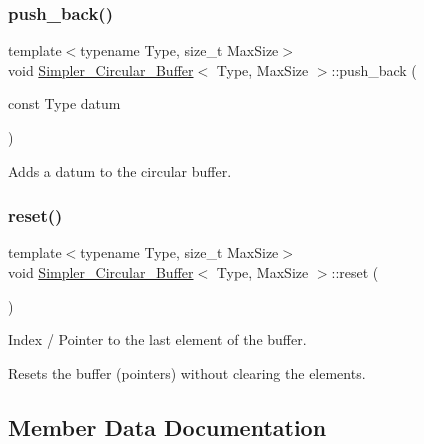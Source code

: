 \mbox{\label{classSimpler__Circular__Buffer_af4bdd0a6d3fc7a8c06f62b0d996158f0}} 
\subsubsection{\texorpdfstring{push\+\_\+back()}{push\_back()}}
{\footnotesize\ttfamily template$<$typename Type, size\+\_\+t Max\+Size$>$ \\
void \hyperlink{classSimpler__Circular__Buffer}{Simpler\+\_\+\+Circular\+\_\+\+Buffer}$<$ Type, Max\+Size $>$\+::push\+\_\+back (\begin{DoxyParamCaption}\item[{const Type}]{datum }\end{DoxyParamCaption})\hspace{0.3cm}{\ttfamily [inline]}}



Adds a datum to the circular buffer. 

\mbox{\label{classSimpler__Circular__Buffer_a793cdb8134afe48ef9918fa0428dfbb6}} 
\subsubsection{\texorpdfstring{reset()}{reset()}}
{\footnotesize\ttfamily template$<$typename Type, size\+\_\+t Max\+Size$>$ \\
void \hyperlink{classSimpler__Circular__Buffer}{Simpler\+\_\+\+Circular\+\_\+\+Buffer}$<$ Type, Max\+Size $>$\+::reset (\begin{DoxyParamCaption}{ }\end{DoxyParamCaption})\hspace{0.3cm}{\ttfamily [inline]}}



Index / Pointer to the last element of the buffer. 

Resets the buffer (pointers) without clearing the elements. 

\subsection{Member Data Documentation}
\mbox{\label{classSimpler__Circular__Buffer_a05808047d226985470e02e84b44bee9a}} 
